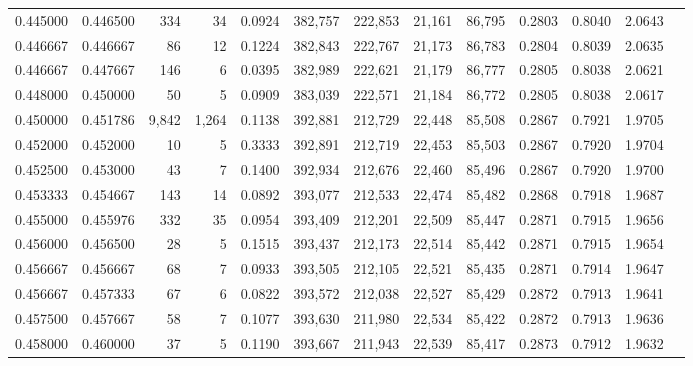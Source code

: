 \begin{tabular}{rrrrrrrrrrrrr}
0.445000 & 0.446500 &    334 &    34 &                                     0.0924 & 382,757 & 222,853 &  21,161 &  86,795 & 0.2803 & 0.8040 & 2.0643 \\
0.446667 & 0.446667 &     86 &    12 &                                     0.1224 & 382,843 & 222,767 &  21,173 &  86,783 & 0.2804 & 0.8039 & 2.0635 \\
0.446667 & 0.447667 &    146 &     6 &                                     0.0395 & 382,989 & 222,621 &  21,179 &  86,777 & 0.2805 & 0.8038 & 2.0621 \\
0.448000 & 0.450000 &     50 &     5 &                                     0.0909 & 383,039 & 222,571 &  21,184 &  86,772 & 0.2805 & 0.8038 & 2.0617 \\
0.450000 & 0.451786 &  9,842 & 1,264 &                                     0.1138 & 392,881 & 212,729 &  22,448 &  85,508 & 0.2867 & 0.7921 & 1.9705 \\
0.452000 & 0.452000 &     10 &     5 &                                     0.3333 & 392,891 & 212,719 &  22,453 &  85,503 & 0.2867 & 0.7920 & 1.9704 \\
0.452500 & 0.453000 &     43 &     7 &                                     0.1400 & 392,934 & 212,676 &  22,460 &  85,496 & 0.2867 & 0.7920 & 1.9700 \\
0.453333 & 0.454667 &    143 &    14 &                                     0.0892 & 393,077 & 212,533 &  22,474 &  85,482 & 0.2868 & 0.7918 & 1.9687 \\
0.455000 & 0.455976 &    332 &    35 &                                     0.0954 & 393,409 & 212,201 &  22,509 &  85,447 & 0.2871 & 0.7915 & 1.9656 \\
0.456000 & 0.456500 &     28 &     5 &                                     0.1515 & 393,437 & 212,173 &  22,514 &  85,442 & 0.2871 & 0.7915 & 1.9654 \\
0.456667 & 0.456667 &     68 &     7 &                                     0.0933 & 393,505 & 212,105 &  22,521 &  85,435 & 0.2871 & 0.7914 & 1.9647 \\
0.456667 & 0.457333 &     67 &     6 &                                     0.0822 & 393,572 & 212,038 &  22,527 &  85,429 & 0.2872 & 0.7913 & 1.9641 \\
0.457500 & 0.457667 &     58 &     7 &                                     0.1077 & 393,630 & 211,980 &  22,534 &  85,422 & 0.2872 & 0.7913 & 1.9636 \\
0.458000 & 0.460000 &     37 &     5 &                                     0.1190 & 393,667 & 211,943 &  22,539 &  85,417 & 0.2873 & 0.7912 & 1.9632 \\

\end{tabular}
